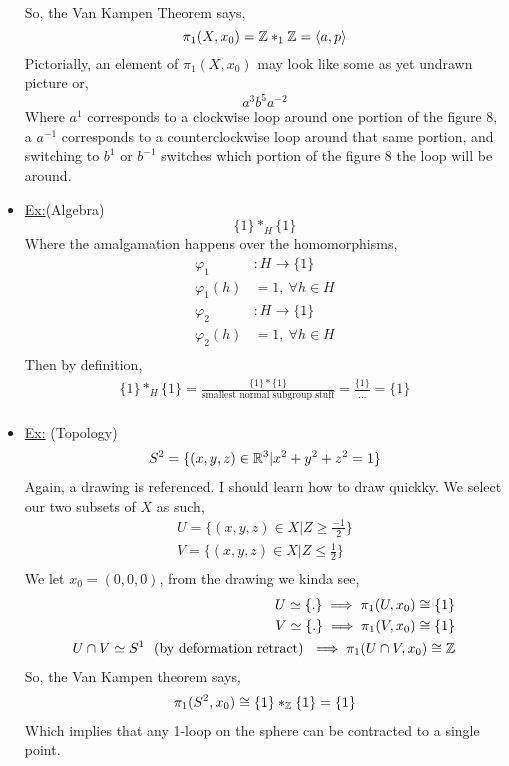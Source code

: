 \documentclass[../notes.tex]{subfiles}
\begin{document}
\begin{itemize}
\begin{align*}
        \end{align*}
        So, the Van Kampen Theorem says,
        \[
            \pi_1(X,x_0)=\mathbb{Z}*_{1}\mathbb{Z}=\langle a,p \rangle
        \]
        Pictorially, an element of $\pi_1(X,x_0)$ may look like some as yet undrawn
        picture or,
        \[
            a^3b^5a^{-2}
        \]
        Where $a^1$ corresponds to a clockwise loop around one portion of the figure 8,
        a $a^{-1}$ corresponds to a counterclockwise loop around that same portion, and
        switching to $b^1$ or $b^{-1}$ switches which portion of the figure 8 the loop will be around.
    \item \underline{Ex:}(Algebra) 
        \[
            \{1\}*_H\{1\}
        \]
        Where the amalgamation happens over the homomorphisms,
        \begin{align*}
            \varphi_1&: H \rightarrow \{1\}\\
            \varphi_1(h)&=1,\ \forall h\in H\\
            \varphi_2&: H \rightarrow \{1\}\\
            \varphi_2(h)&=1,\ \forall h\in H\\
        \end{align*}
        Then by definition,
        \begin{align*}
            \{1\}*_H\{1\}=\frac{\{1\}*\{1\}}{\text{smallest normal subgroup stuff}}
            =\frac{\{1\}}{\dots}=\{1\}\\
        \end{align*}
    \item \underline{Ex:} (Topology)
        \begin{align*}
            S^2=\{(x,y,z)\in \mathbb{R}^3| x^2+y^2+z^2=1\}\\
        \end{align*}
        Again, a drawing is referenced. I should learn how to draw quickky. We select
        our two subsets of $X$ as such,
        \begin{align*}
            U = \{(x,y,z)\in X| Z\ge \frac{-1}{2}\}\\
            V = \{(x,y,z)\in X| Z\le \frac{1}{2}\}\\
        \end{align*}
        We let $x_0=(0,0,0)$, from the drawing we kinda see,
        \begin{align*}
            U\simeq \{.\}\implies \pi_1(U,x_0)\cong \{1\}\\
            V\simeq \{.\}\implies \pi_1(V,x_0)\cong \{1\}\\
            U\cap V \simeq S^1\ \text{
                (by deformation retract)
            }\implies\pi_1(U\cap V,x_0)\cong \mathbb{Z}\\
        \end{align*}
        So, the Van Kampen theorem says,
        \begin{align*}
            \pi_1(S^2, x_0)\cong\{1\}*_{\mathbb{Z}}\{1\}=\{1\}\\
        \end{align*}
        Which implies that any 1-loop on the sphere can be contracted to a single point.
\end{itemize}
\end{document}
